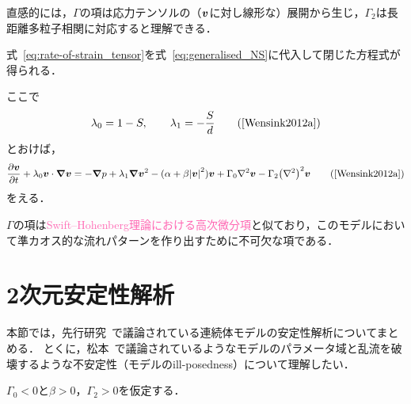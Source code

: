 \documentclass[12pt,dvipdfmx,svgnames,a4paper,uplatex]{ujarticle}
\theoremstyle{plain}
\begin{document}
直感的には，\(\Gamma\)の項は応力テンソルの（\(\vb*{v}\)に対し線形な）展開から生じ，\(\Gamma_2\)は長距離多粒子相関に対応すると理解できる．

式~\ref{eq:rate-of-strain_tensor}を式~\ref{eq:generalised_NS}に代入して閉じた方程式が得られる．
ここで
\begin{equation}
  \lambda_0 = 1 - S, \qquad \lambda_1 = -\frac{S}{d}
  \label{eq:def_lambda0_lambda1}
  \tag{\cite[Eq. 21]{Wensink2012a}}
\end{equation}
とおけば，
\begin{equation}
  \pdv{\vb*{v}}{t} + \lambda_0 \vb*{v} \cdot \grad{\vb*{v}} = -\grad{p} + \lambda_1 \grad{\vb*{v}^2} - (\alpha + \beta \abs{\vb*{v}}^2) \vb*{v} + \Gamma_0 \laplacian \vb*{v} - \Gamma_2 \qty(\laplacian)^2 \vb*{v}
  \label{eq:continuous_model}
  \tag{\cite[Eq. 22]{Wensink2012a}}
\end{equation}
をえる．

\(\Gamma\)の項は\textcolor{HotPink}{Swift--Hohenberg理論における高次微分項}と似ており，このモデルにおいて準カオス的な流れパターンを作り出すために不可欠な項である．


\section{2次元安定性解析}
\label{sec:2D_stability_analysis}

本節では，先行研究~\cite{Wensink2012a, Dunkel2013a}で議論されている連続体モデルの安定性解析についてまとめる．
とくに，松本~\cite{Matsumoto2014b}で議論されているようなモデルのパラメータ域と乱流を破壊するような不安定性（モデルのill-posedness）について理解したい．

\(\Gamma_0 < 0\)と\(\beta > 0\)，\(\Gamma_2 > 0\)を仮定する．
\end{document}
